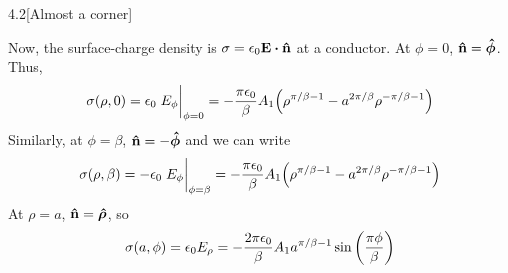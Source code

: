 \documentclass[12pt]{article}
\begin{document}
\begin{problem}{4.2}[Almost a corner]
\begin{solution}
Now, the surface-charge density is $\sigma=\epsilon_0\vb{E}\vdot\nhat$ at a
conductor. At $\phi=0$, $\vb{\hat{n}}=\bm{\hat{\phi}}$. Thus,
\begin{equation}\label{p2b:sig_rho1}
    \sigma(\rho,0)=\epsilon_0
    \eval{E_\phi}_{\phi=0}
    =-\frac{\pi\epsilon_0}{\beta}A_1\qty(\rho^{\pi/\beta-1}-a^{2\pi/\beta}\rho^{-\pi/\beta-1}) 
\end{equation}
Similarly, at $\phi=\beta$, $\vb{\hat{n}}=-\bm{\hat{\phi}}$ and we can write
\begin{equation}\label{p2b:sig_rho2}
    \sigma(\rho,\beta)=
    -\epsilon_0\eval{E_\phi}_{\phi=\beta}
    =-\frac{\pi\epsilon_0}{\beta}A_1\qty(\rho^{\pi/\beta-1}-a^{2\pi/\beta}\rho^{-\pi/\beta-1}) 
\end{equation}
At $\rho=a$, $\vb{\hat{n}}=\bm{\hat\rho}$, so
\begin{equation}\label{p2b:sig_phi}
    \sigma(a,\phi)=\epsilon_0E_\rho
    =-\frac{2\pi\epsilon_0}{\beta}A_1a^{\pi/\beta-1}\sin\qty(\frac{\pi\phi}{\beta})
\end{equation}


\end{solution}
\end{problem}
\end{document}
